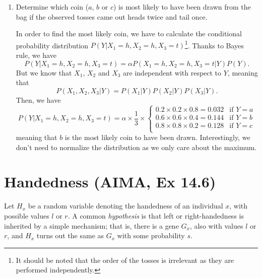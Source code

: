 \documentclass[11pt, a4paper]{article}
\begin{document}
\begin{enumerate}
    \item Determine which coin ($a$, $b$ or $c$) is most likely to have been drawn from the bag if the observed tosses came out heads twice and tail once.

    \begin{solution}
        In order to find the most likely coin, we have to calculate the conditional probability distribution $P(Y | X_1 = h, X_2 = h, X_3 = t)$\footnote{It should be noted that the order of the tosses is irrelevant as they are performed independently.}. Thanks to Bayes rule, we have
        \begin{equation*}
        P(Y | X_1 = h, X_2 = h, X_3 = t) = \alpha P(X_1 = h, X_2 = h, X_3 = t | Y) P(Y).
        \end{equation*}
        But we know that $X_1$, $X_2$ and $X_3$ are independent with respect to $Y$, meaning that
        \begin{equation*}
            P(X_1, X_2, X_3 | Y) = P(X_1 | Y) P(X_2 | Y) P(X_3 | Y).
        \end{equation*}
        Then, we have
        \begin{equation*}
            P(Y | X_1 = h, X_2 = h, X_3 = t) = \alpha \times \frac{1}{3} \times \begin{cases}
                0.2 \times 0.2 \times 0.8 = \num{0.032} & \text{if } Y = a \\
                0.6 \times 0.6 \times 0.4 = \num{0.144} & \text{if } Y = b \\
                0.8 \times 0.8 \times 0.2 = \num{0.128} & \text{if } Y = c \\
            \end{cases}
        \end{equation*}
        meaning that $b$ is the most likely coin to have been drawn. Interestingly, we don't need to normalize the distribution as we only care about the maximum.
    \end{solution}
\end{enumerate}

\newpage

\section{Handedness (AIMA, Ex 14.6)}

Let $H_x$ be a random variable denoting the handedness of an individual $x$, with possible values $l$ or $r$. A common \emph{hypothesis} is that left or right-handedness is inherited by a simple mechanism; that is, there is a gene $G_x$, also with values $l$ or $r$, and $H_x$ turns out the same as $G_x$ with some probability $s$.
\end{document}
